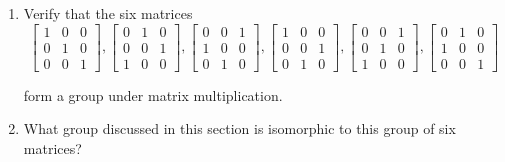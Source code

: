 \newpage
\begin{exercise}
    \begin{enumerate}[label={\textbf{\alph*.}}]
        \item Verify that the six matrices
              \[
                  \begin{bmatrix}
                      1 & 0 & 0 \\
                      0 & 1 & 0 \\
                      0 & 0 & 1
                  \end{bmatrix},
                  \begin{bmatrix}
                      0 & 1 & 0 \\
                      0 & 0 & 1 \\
                      1 & 0 & 0
                  \end{bmatrix},
                  \begin{bmatrix}
                      0 & 0 & 1 \\
                      1 & 0 & 0 \\
                      0 & 1 & 0
                  \end{bmatrix},
                  \begin{bmatrix}
                      1 & 0 & 0 \\
                      0 & 0 & 1 \\
                      0 & 1 & 0
                  \end{bmatrix},
                  \begin{bmatrix}
                      0 & 0 & 1 \\
                      0 & 1 & 0 \\
                      1 & 0 & 0
                  \end{bmatrix},
                  \begin{bmatrix}
                      0 & 1 & 0 \\
                      1 & 0 & 0 \\
                      0 & 0 & 1
                  \end{bmatrix}
              \]

              form a group under matrix multiplication.
        \item What group discussed in this section is isomorphic to this group of six matrices?
    \end{enumerate}
\end{exercise}

